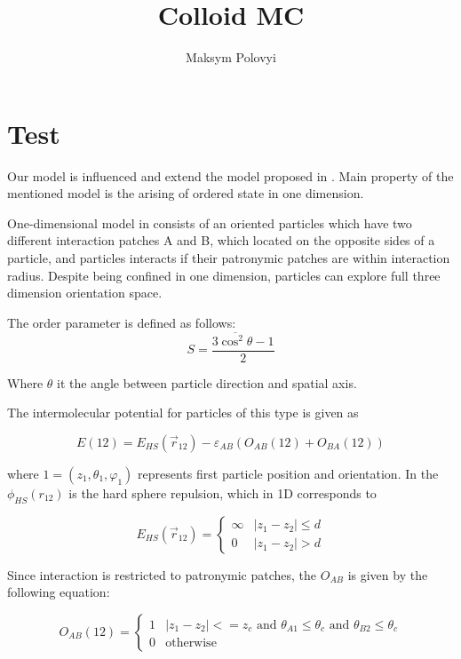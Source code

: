 \documentclass[12pt,a4paper]{article}
\author{Maksym Polovyi}
\title{Colloid MC}
\begin{document}
\section{Test}

Our model is influenced and extend the model proposed in \cite{Marshall2015}. Main property of the mentioned model is the arising of ordered state in one dimension.

One-dimensional model in \cite{Marshall2015} consists of an oriented particles which have two different interaction patches A and B, which located on the opposite sides of a particle, and particles interacts if their patronymic patches are within interaction radius. Despite being confined in one dimension, particles can explore full three dimension orientation space.

The order parameter is defined as follows:
\begin{equation}
S = \frac{3 \overline{\cos^2 \theta} - 1}{2}
\end{equation}

Where $\theta$ it the angle between particle direction and spatial axis.

The intermolecular potential for particles of this type is given as

\begin{equation}
E(12) = E_{HS}(\vec{r}_{12}) - \varepsilon_{AB}(O_{AB}(12) + O_{BA}(12))
\end{equation}

where $1 = (z_1, \theta_1, \varphi_1)$ represents first particle position and orientation. In \cite{Marshall2015} the $\phi_{HS}(r_{12})$ is the hard sphere repulsion, which in 1D corresponds to

\begin{equation}
E_{HS}(\vec{r}_{12}) = \begin{cases}
	\infty &\text{$|z_1 - z_2| \leq d$}\\
   	0 	&\text{$|z_1 - z_2| > d$}
\end{cases}
\end{equation}

Since interaction is restricted to patronymic patches, the $O_{AB}$ is given by the following equation:

\begin{equation}
O_{AB}(12) = \begin{cases}
	1 &\text{$|z_1 - z_2| <= z_c$ and $\theta_{A1} \leq \theta_c$ and $\theta_{B2} \leq \theta_c $}\\
   	0 &\text{otherwise}
\end{cases}
\end{equation}
\end{document}
